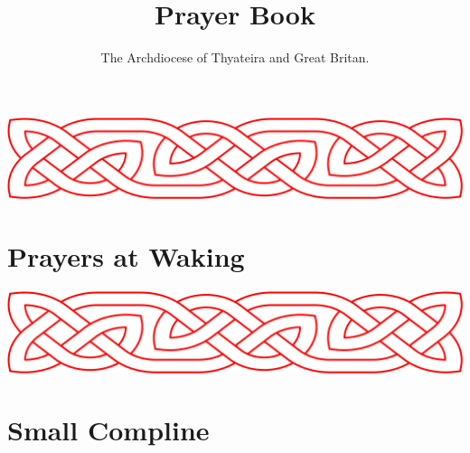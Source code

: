 \documentclass[8pt]{extarticle}
\title{Prayer Book}
\author{The Archdiocese of Thyateira and Great Britan.}
\begin{document}



\maketitle
\pagebreak

\tableofcontents
\pagebreak

\includegraphics[width=1\textwidth]{assets/celtic-knot-banner.png}
\section{Prayers at Waking}

\pagebreak

\includegraphics[width=1\textwidth]{assets/celtic-knot-banner.png}
\section{Small Compline}

\pagebreak
\end{document}
